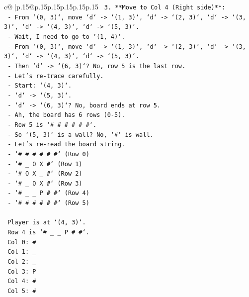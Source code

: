 \documentclass{article}
\begin{document}
{\begin{supertabular}{c@{$\;$}|p{.15\linewidth}@{}p{.15\linewidth}p{.15\linewidth}p{.15\linewidth}p{.15\linewidth}p{.15\linewidth}}
{{{\texttt{    3.  **Move to Col 4 (Right side)**:} \\
\texttt{        {-} From `(0, 3)`, move `d` {-}> `(1, 3)`, `d` {-}> `(2, 3)`, `d` {-}> `(3, 3)`, `d` {-}> `(4, 3)`, `d` {-}> `(5, 3)`.} \\
\texttt{        {-} Wait, I need to go to `(1, 4)`.} \\
\texttt{        {-} From `(0, 3)`, move `d` {-}> `(1, 3)`, `d` {-}> `(2, 3)`, `d` {-}> `(3, 3)`, `d` {-}> `(4, 3)`, `d` {-}> `(5, 3)`.} \\
\texttt{        {-} Then `d` {-}> `(6, 3)`? No, row 5 is the last row.} \\
\texttt{        {-} Let's re{-}trace carefully.} \\
\texttt{        {-} Start: `(4, 3)`.} \\
\texttt{        {-} `d` {-}> `(5, 3)`.} \\
\texttt{        {-} `d` {-}> `(6, 3)`? No, board ends at row 5.} \\
\texttt{        {-} Ah, the board has 6 rows (0{-}5).} \\
\texttt{        {-} Row 5 is `\# \# \# \# \# \#`.} \\
\texttt{        {-} So `(5, 3)` is a wall? No, `\#` is wall.} \\
\texttt{        {-} Let's re{-}read the board string.} \\
\texttt{        {-} `\# \# \# \# \# \#` (Row 0)} \\
\texttt{        {-} `\# \_ O X \#` (Row 1)} \\
\texttt{        {-} `\# O X \_ \#` (Row 2)} \\
\texttt{        {-} `\# \_ O X \#` (Row 3)} \\
\texttt{        {-} `\# \_ \_ P \# \#` (Row 4)} \\
\texttt{        {-} `\# \# \# \# \# \#` (Row 5)} \\
\\ 
\texttt{        Player is at `(4, 3)`.} \\
\texttt{        Row 4 is `\# \_ \_ P \# \#`.} \\
\texttt{        Col 0: \#} \\
\texttt{        Col 1: \_} \\
\texttt{        Col 2: \_} \\
\texttt{        Col 3: P} \\
\texttt{        Col 4: \#} \\
\texttt{        Col 5: \#} \\
\\ 
}}}
\end{supertabular}}
\end{document}
